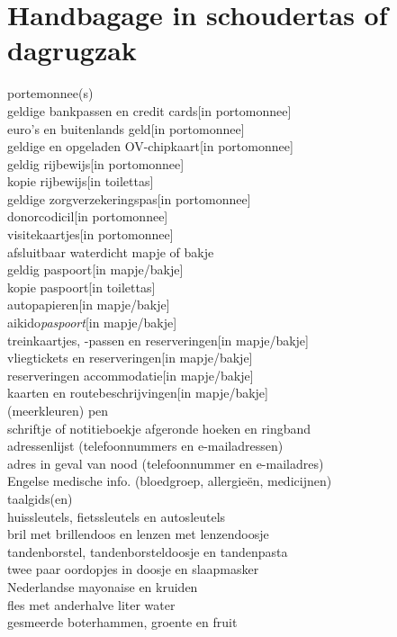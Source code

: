 \documentclass[9pt,twocolumn]{memoir}
\begin{document}
\section*{Handbagage in schoudertas of dagrugzak}
portemonnee(s)\\
geldige bankpassen en credit cards\hfill[in portomonnee]\\
euro's en buitenlands geld\hfill[in portomonnee]\\
geldige en opgeladen OV-chipkaart\hfill[in portomonnee]\\
geldig rijbewijs\hfill[in portomonnee]\\
kopie rijbewijs\hfill[in toilettas]\\
geldige zorgverzekeringspas\hfill[in portomonnee]\\
donorcodicil\hfill[in portomonnee]\\
visitekaartjes\hfill[in portomonnee]\\
afsluitbaar waterdicht mapje of bakje\\
geldig paspoort\hfill[in mapje/bakje]\\
kopie paspoort\hfill[in toilettas]\\
autopapieren\hfill[in mapje/bakje]\\
aikido{\itshape{paspoort}}\hfill[in mapje/bakje]\\
treinkaartjes, -passen en reserveringen\hfill[in mapje/bakje]\\
vliegtickets en reserveringen\hfill[in mapje/bakje]\\
reserveringen accommodatie\hfill[in mapje/bakje]\\
kaarten en routebeschrijvingen\hfill[in mapje/bakje]\\
(meerkleuren) pen\\
schriftje of notitieboekje afgeronde hoeken en ringband\\
adressenlijst (telefoonnummers en e-mailadressen)\\
adres in geval van nood (telefoonnummer en e-mailadres)\\
Engelse medische info. (bloedgroep, allergieën, medicijnen)\\
taalgids(en)\\
huissleutels, fietssleutels en autosleutels\\
bril met brillendoos en lenzen met lenzendoosje\\
tandenborstel, tandenborsteldoosje en tandenpasta\\
twee paar oordopjes in doosje en slaapmasker\\
Nederlandse mayonaise en kruiden\\
fles met anderhalve liter water\\
gesmeerde boterhammen, groente en fruit
\end{document}
